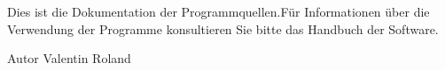 Dies ist die Dokumentation der Programmquellen.\-Für Informationen über die Verwendung der Programme konsultieren Sie bitte das Handbuch der Software.

\begin{DoxyAuthor}{Autor}
Valentin Roland 
\end{DoxyAuthor}
